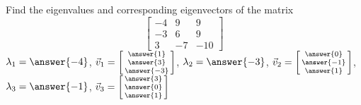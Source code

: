 \documentclass{ximera}
\begin{document}
\begin{exercise}%
    Find the eigenvalues and corresponding eigenvectors of the matrix 
    \[ 
    \begin{bmatrix} 
    -4 & 9 & 9 \\ 
    -3 & 6 & 9 \\ 
    3 & -7 & -10 
    \end{bmatrix} 
    \]
    $\lambda_1 = \answer{-4}$, $\vec{v}_1 = \left[\begin{smallmatrix} \answer{1}\\ \answer{3}\\ \answer{-3} \end{smallmatrix}\right]$, $\lambda_2 = \answer{-3}$, $\vec{v}_2 = \left[\begin{smallmatrix} \answer{0}\\ \answer{-1}\\ \answer{1} \end{smallmatrix}\right]$, $\lambda_3 = \answer{-1}$, $\vec{v}_3 = \left[\begin{smallmatrix} \answer{3}\\ \answer{0}\\ \answer{1} \end{smallmatrix}\right]$
\end{exercise}
\end{document}
